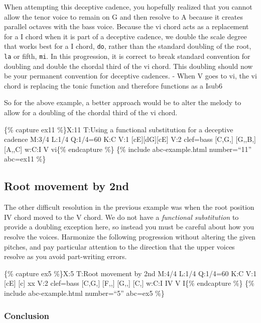 \documentclass{book}
\begin{document}
When attempting this deceptive cadence, you hopefully realized that you cannot
allow the tenor voice to remain on G and then resolve to A because it creates
parallel octaves with the bass voice. Because the vi chord acts as a
replacement for a I chord when it is part of a deceptive cadence, we double
the scale degree that works best for a I chord, \texttt{do}, rather than the
standard doubling of the root, \texttt{la} or fifth, \texttt{mi}. In this
progression, it is correct to break standard convention for doubling and
double the chordal third of the vi chord. This doubling should now be your
permanent convention for deceptive cadences. - When V goes to vi, the vi chord
is replacing the tonic function and therefore functions as a Isub6

So for the above example, a better approach would be to alter the melody to
allow for a doubling of the chordal third of the vi chord.

\{\% capture ex11 \%\}X:11 T:Using a functional substitution for a deceptive
cadence M:3/4 L:1/4 Q:1/4=60 K:C V:1 {[}cE{]}{[}dG{]}{[}cE{]}\textbar{]} V:2
clef=bass {[}C,G,{]} {[}G,,B,{]} {[}A,,C{]}\textbar{]} w:C:I V vi\{\%
endcapture \%\} \{\% include abc-example.html number=``11'' abc=ex11 \%\}

\hypertarget{root-movement-by-2nd}{%
\subsection{Root movement by 2nd}\label{root-movement-by-2nd}}

The other difficult resolution in the previous example was when the root
position IV chord moved to the V chord. We do not have a \emph{functional
substitution} to provide a doubling exception here, so instead you must be
careful about how you resolve the voices. Harmonize the following progression
without altering the given pitches, and pay particular attention to the
direction that the upper voices resolve as you avoid part-writing errors.

\{\% capture ex5 \%\}X:5 T:Root movement by 2nd M:4/4 L:1/4 Q:1/4=60 K:C V:1
{[}cE{]} {[}c{]} xx\textbar{]} V:2 clef=bass {[}C,G,{]} {[}F,,{]} {[}G,,{]}
{[}C,{]}\textbar{]} w:C:I IV V I\{\% endcapture \%\} \{\% include
abc-example.html number=``5'' abc=ex5 \%\}

\hypertarget{conclusion-20}{%
\subsubsection{Conclusion}\label{conclusion-20}}
\end{document}
